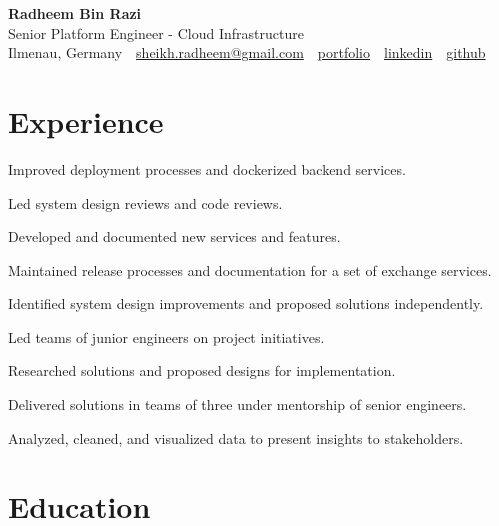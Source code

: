 \documentclass[11pt,a4paper]{resume}
\makeatletter
\newcommand{\Portfolio}{https://radheem.github.io/my-cv}
\newcommand{\PortfolioText}{portfolio}
\newcommand{\GitHub}{https://github.com/radheem}
\newcommand{\LinkedIn}{https://www.linkedin.com/in/radheem-razi}
\newcommand{\Email}{sheikh.radheem@gmail.com}
\makeatother
\begin{document}
\begin{center}
  {\huge\bfseries Radheem Bin Razi}\\[3pt]
  {\large Senior Platform Engineer - Cloud Infrastructure}\\[6pt]
  \small
  Ilmenau, Germany \,\textbar\,
  \href{mailto:\Email}{\Email} \,\textbar\,
  \href{\Portfolio}{\PortfolioText} \,\textbar\,
  \href{\LinkedIn}{linkedin} \,\textbar\,
  \href{\GitHub}{github}
\end{center}
\vspace{2pt}

\section{Experience}

\bullets
  \item Improved deployment processes and dockerized backend services.
  \item Led system design reviews and code reviews.
  \item Developed and documented new services and features.
\bulletsend
\vspace{3pt}
\bullets
  \item Maintained release processes and documentation for a set of exchange services.
  \item Identified system design improvements and proposed solutions independently.
  \item Led teams of junior engineers on project initiatives.
\bulletsend
\vspace{3pt}
\bullets
  \item Researched solutions and proposed designs for implementation.
  \item Delivered solutions in teams of three under mentorship of senior engineers.
  \item Analyzed, cleaned, and visualized data to present insights to stakeholders.
\bulletsend
\vspace{3pt}

\section{Education}

\vspace{2pt}
\end{document}
